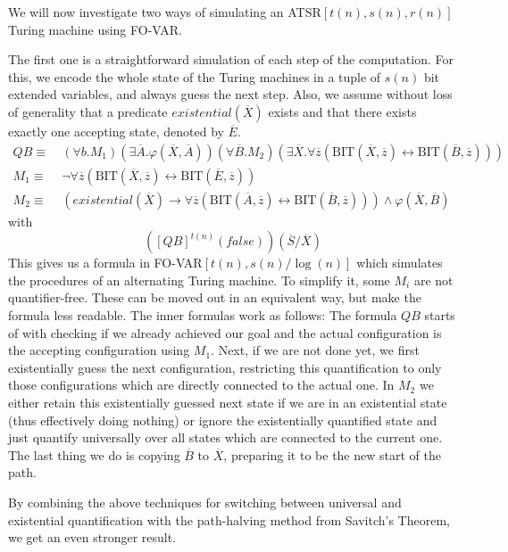 We will now investigate two ways of simulating an ATSR$[t(n), s(n), r(n)]$ Turing machine using FO-VAR\@.

The first one is a straightforward simulation of each step of the computation.
For this, we encode the whole state of the Turing machines in a tuple of $s(n)$ bit extended variables, and always guess the next step.
Also, we assume without loss of generality that a predicate $existential(\overline{X})$ exists and that there exists exactly one accepting state, denoted by $\overline{E}$.
\[
    \begin{aligned}
        QB \equiv~&(\forall b.M_{1})(\exists\overline{A}.\varphi(\overline{X}, \overline{A}))(\forall \overline{B}.M_{2})(\exists \overline{X}. \forall \overline{z}(\text{BIT}(\overline{X}, \overline{z}) \leftrightarrow \text{BIT}(\overline{B}, \overline{z}))) \\
        M_{1} \equiv~&\neg\forall \overline{z}(\text{BIT}(\overline{X}, \overline{z}) \leftrightarrow \text{BIT}(\overline{E}, \overline{z})) \\
        M_{2} \equiv~& (existential(\overline{X}) \to \forall \overline{z}(\text{BIT}(\overline{A}, \overline{z}) \leftrightarrow \text{BIT}(\overline{B}, \overline{z}))) \land \varphi(\overline{X}, \overline{B})
    \end{aligned}
\]
with \[
         \left([QB]^{t(n)}(false)\right)(\overline{S} / \overline{X})
\]
This gives us a formula in FO-VAR$[t(n), s(n)/\log(n)]$ which simulates the procedures of an alternating Turing machine.
To simplify it, some $M_i$ are not quantifier-free.
These can be moved out in an equivalent way, but make the formula less readable.
The inner formulas work as follows:
The formula $QB$ starts of with checking if we already achieved our goal and the actual configuration is the accepting configuration using $M_1$.
Next, if we are not done yet, we first existentially guess the next configuration, restricting this quantification to only those configurations which are directly connected to the actual one.
In $M_2$ we either retain this existentially guessed next state if we are in an existential state (thus effectively doing nothing) or ignore the existentially quantified state and just quantify universally over all states which are connected to the current one.
The last thing we do is copying $\overline{B}$ to $\overline{X}$, preparing it to be the new start of the path.

By combining the above techniques for switching between universal and existential quantification with the path-halving method from Savitch's Theorem, we get an even stronger result.

